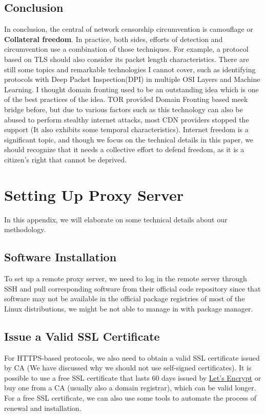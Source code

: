 \documentclass[conference]{IEEEtran}
\begin{document}
\subsection{Conclusion}
In conclusion, the central of network censorship circumvention is camouflage or \textbf{Collateral freedom}. In practice, both sides, efforts of detection and circumvention use a combination of those techniques. For example, a protocol based on TLS should also consider its packet length characteristics. There are still some topics and remarkable technologies I cannot cover, such as identifying protocols with Deep Packet Inspection(DPI) in multiple OSI Layers and Machine Learning. I thought domain fronting used to be an outstanding idea which is one of the best practices of the idea. TOR provided Domain Fronting based meek bridge before,  but due to various factors such as this technology can also be abused to perform stealthy internet attacks, most CDN providers stopped the support (It also exhibits some temporal characteristics). Internet freedom is a significant topic, and though we focus on the technical details in this paper, we should recognize that it needs a collective effort to defend freedom, as it is a citizen's right that cannot be deprived.





\appendix
\section{Setting Up Proxy Server}
In this appendix, we will elaborate on some technical details about our methodology.

\subsection{Software Installation}
To set up a remote proxy server, we need to log in the remote server through SSH and pull corresponding software from their official code repository since that software may not be available in the official package registries of most of the Linux distributions, we might be not able to manage in with package manager.

\subsection{Issue a Valid SSL Certificate}
For HTTPS-based protocols, we also need to obtain a valid SSL certificate issued by CA (We have discussed why we should not use self-signed certificates). It is possible to use a free SSL certificate that lasts 60 days issued by \href{https://letsencrypt.org/}{Let's Encrypt} or buy one from a CA (usually also a domain registrar), which can be valid longer. For a free SSL certificate, we can also use some tools to automate the process of renewal and installation.
\end{document}
